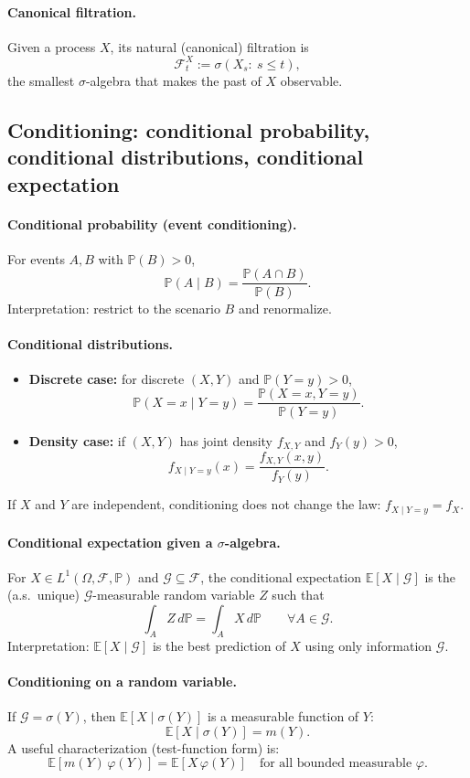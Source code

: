 \documentclass[11pt]{article}
\newcommand{\Pbb}{\mathbb{P}}
\newcommand{\E}{\mathbb{E}}
\newcommand{\1}{\mathbf{1}}
\theoremstyle{plain}
\theoremstyle{definition}
\theoremstyle{remark}
\begin{document}
\paragraph{Canonical filtration.}
Given a process $X$, its natural (canonical) filtration is
\[
\mathcal F^X_t := \sigma(X_s:\ s\le t),
\]
the smallest $\sigma$-algebra that makes the past of $X$ observable.

\subsection{Conditioning: conditional probability, conditional distributions, conditional expectation}

\paragraph{Conditional probability (event conditioning).}
For events $A,B$ with $\Pbb(B)>0$,
\[
\Pbb(A\mid B)=\frac{\Pbb(A\cap B)}{\Pbb(B)}.
\]
Interpretation: restrict to the scenario $B$ and renormalize.

\paragraph{Conditional distributions.}
\begin{itemize}
\item \textbf{Discrete case:} for discrete $(X,Y)$ and $\Pbb(Y=y)>0$,
\[
\Pbb(X=x\mid Y=y)=\frac{\Pbb(X=x,Y=y)}{\Pbb(Y=y)}.
\]
\item \textbf{Density case:} if $(X,Y)$ has joint density $f_{X,Y}$ and $f_Y(y)>0$,
\[
f_{X\mid Y=y}(x)=\frac{f_{X,Y}(x,y)}{f_Y(y)}.
\]
\end{itemize}
If $X$ and $Y$ are independent, conditioning does not change the law: $f_{X\mid Y=y}=f_X$.

\paragraph{Conditional expectation given a $\sigma$-algebra.}
For $X\in L^1(\Omega,\mathcal F,\Pbb)$ and $\mathcal G\subseteq\mathcal F$,
the conditional expectation $\E[X\mid\mathcal G]$ is the (a.s.\ unique) $\mathcal G$-measurable random variable $Z$ such that
\[
\int_A Z\,d\Pbb=\int_A X\,d\Pbb \qquad \forall A\in\mathcal G.
\]
Interpretation: $\E[X\mid\mathcal G]$ is the best prediction of $X$ using only information $\mathcal G$.

\paragraph{Conditioning on a random variable.}
If $\mathcal G=\sigma(Y)$, then $\E[X\mid\sigma(Y)]$ is a measurable function of $Y$:
\[
\E[X\mid\sigma(Y)] = m(Y).
\]
A useful characterization (test-function form) is:
\[
\E[m(Y)\,\varphi(Y)] = \E[X\,\varphi(Y)]
\quad \text{for all bounded measurable }\varphi.
\]
\end{document}
